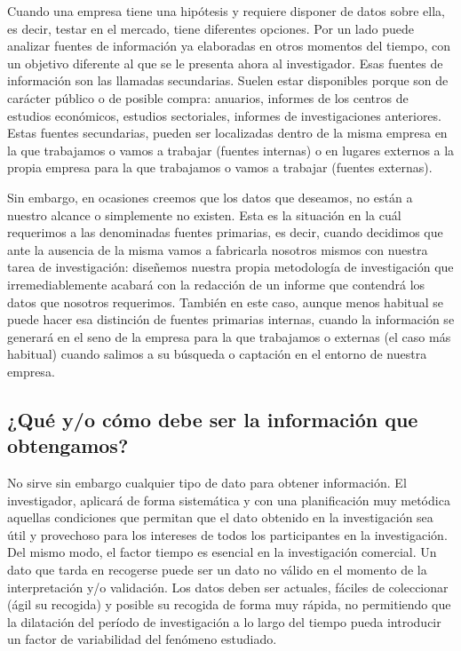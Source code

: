 \documentclass[
]{book}
\begin{document}
Cuando una empresa tiene una hipótesis y requiere disponer de datos sobre ella, es decir, testar en el mercado, tiene diferentes opciones. Por un lado puede analizar fuentes de información ya elaboradas en otros momentos del tiempo, con un objetivo diferente al que se le presenta ahora al investigador. Esas fuentes de información son las llamadas secundarias. Suelen estar disponibles porque son de carácter público o de posible compra: anuarios, informes de los centros de estudios económicos, estudios sectoriales, informes de investigaciones anteriores. Estas fuentes secundarias, pueden ser localizadas dentro de la misma empresa en la que trabajamos o vamos a trabajar (fuentes internas) o en lugares externos a la propia empresa para la que trabajamos o vamos a trabajar (fuentes externas).

Sin embargo, en ocasiones creemos que los datos que deseamos, no están a nuestro alcance o simplemente no existen. Esta es la situación en la cuál requerimos a las denominadas fuentes primarias, es decir, cuando decidimos que ante la ausencia de la misma vamos a fabricarla nosotros mismos con nuestra tarea de investigación: diseñemos nuestra propia metodología de investigación que irremediablemente acabará con la redacción de un informe que contendrá los datos que nosotros requerimos. También en este caso, aunque menos habitual se puede hacer esa distinción de fuentes primarias internas, cuando la información se generará en el seno de la empresa para la que trabajamos o externas (el caso más habitual) cuando salimos a su búsqueda o captación en el entorno de nuestra empresa.

\hypertarget{quuxe9-yo-cuxf3mo-debe-ser-la-informaciuxf3n-que-obtengamos}{%
\subsection{¿Qué y/o cómo debe ser la información que obtengamos?}\label{quuxe9-yo-cuxf3mo-debe-ser-la-informaciuxf3n-que-obtengamos}}

No sirve sin embargo cualquier tipo de dato para obtener información. El investigador, aplicará de forma sistemática y con una planificación muy metódica aquellas condiciones que permitan que el dato obtenido en la investigación sea útil y provechoso para los intereses de todos los participantes en la investigación. Del mismo modo, el factor tiempo es esencial en la investigación comercial. Un dato que tarda en recogerse puede ser un dato no válido en el momento de la interpretación y/o validación. Los datos deben ser actuales, fáciles de coleccionar (ágil su recogida) y posible su recogida de forma muy rápida, no permitiendo que la dilatación del período de investigación a lo largo del tiempo pueda introducir un factor de variabilidad del fenómeno estudiado.
\end{document}
